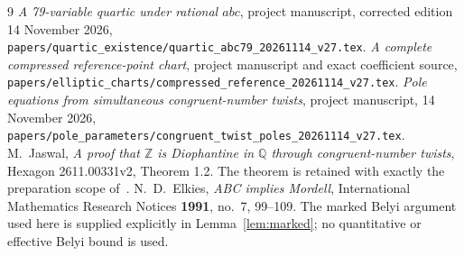 \documentclass[11pt,a4paper]{article}
\theoremstyle{remark}\newtheorem{remark}[theorem]{Remark}
\newcommand{\Q}{\mathbb Q}\newcommand{\Z}{\mathbb Z}
\begin{document}
\begin{thebibliography}{9}
\emph{A 79-variable quartic under rational $abc$},
project manuscript, corrected edition 14 November 2026,
\nolinkurl{papers/quartic_existence/quartic_abc79_20261114_v27.tex}.
\emph{A complete compressed reference-point chart},
project manuscript and exact coefficient source,
\nolinkurl{papers/elliptic_charts/compressed_reference_20261114_v27.tex}.
\emph{Pole equations from simultaneous congruent-number twists},
project manuscript, 14 November 2026,
\nolinkurl{papers/pole_parameters/congruent_twist_poles_20261114_v27.tex}.
M.~Jaswal, \emph{A proof that $\Z$ is Diophantine in $\Q$
through congruent-number twists}, Hexagon 2611.00331v2, Theorem 1.2.
The theorem is retained with exactly the preparation scope of~\cite{Pole}.
N.~D.~Elkies, \emph{ABC implies Mordell},
International Mathematics Research Notices \textbf{1991}, no.~7, 99--109.
The marked Belyi argument used here is supplied explicitly in
Lemma~\ref{lem:marked}; no quantitative or effective Belyi bound is used.
\end{thebibliography}
\end{document}

